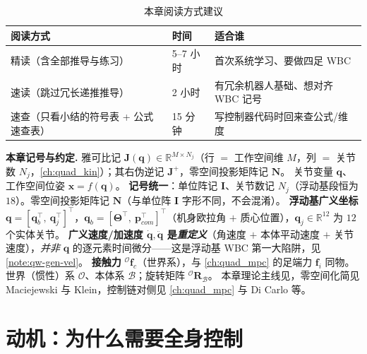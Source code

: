 \begin{table}[H]\centering\small
\caption{本章阅读方式建议}
\begin{tabular}{lll}
\toprule
阅读方式 & 时间 & 适合谁 \\
\midrule
精读（含全部推导与练习） & 5--7 小时 & 首次系统学习、要做四足 WBC \\
速读（跳过冗长递推推导） & 2 小时 & 有冗余机器人基础、想对齐 WBC 记号 \\
速查（只看小结的符号表 + 公式速查表） & 15 分钟 & 写控制器代码时回来查公式/维度 \\
\bottomrule
\end{tabular}
\end{table}

\begin{note}
\textbf{本章记号与约定.}\;
雅可比记 $\boldsymbol{J}(\boldsymbol{q})\in\mathbb{R}^{M\times N_j}$（行 $=$ 工作空间维 $M$，列 $=$ 关节数 $N_j$，\cref{ch:quad_kin}）；其右伪逆记 $\boldsymbol{J}^+$，零空间投影矩阵记 $\boldsymbol{N}$。
关节变量 $\boldsymbol{q}$、工作空间位姿 $\boldsymbol{x}=f(\boldsymbol{q})$。
\textbf{记号统一}：单位阵记 $\mathbf{I}$、关节数记 $N_j$（浮动基段恒为 $18$）。零空间投影矩阵记 $\boldsymbol{N}$（与单位阵 $\mathbf{I}$ 字形不同，不会混淆）。
\textbf{浮动基广义坐标} $\boldsymbol{q}=[\boldsymbol{q}_b^\top,\ \boldsymbol{q}_j^\top]^\top$，$\boldsymbol{q}_b=[\boldsymbol{\Theta}^\top,\ \boldsymbol{p}_{com}^\top]^\top$（机身欧拉角 $+$ 质心位置），$\boldsymbol{q}_j\in\mathbb{R}^{12}$ 为 $12$ 个实体关节。
\textbf{广义速度/加速度 $\dot{\boldsymbol{q}},\ddot{\boldsymbol{q}}$ 是\emph{重定义}}（角速度 $+$ 本体平动速度 $+$ 关节速度），\emph{并非} $\boldsymbol{q}$ 的逐元素时间微分——这是浮动基 WBC 第一大陷阱，见 \cref{note:qw-gen-vel}。
\textbf{接触力} ${}^{\mathcal{O}}\boldsymbol{f}_c$（世界系），与 \cref{ch:quad_mpc} 的足端力 $\boldsymbol{f}_i$ 同物。
世界（惯性）系 $\mathcal{O}$、本体系 $\mathcal{B}$；旋转矩阵 ${}^{\mathcal{O}}\mathbf{R}_{\mathcal{B}}$。
本章理论主线见\cite{yu2021quadruped}，零空间化简见 Maciejewski 与 Klein\cite{maciejewski1985obstacle}，控制链对侧见 \cref{ch:quad_mpc} 与 Di Carlo 等\cite{dicarlo2018cheetah}。
\end{note}

\section{动机：为什么需要全身控制}
\label{sec:qw-motivation}

